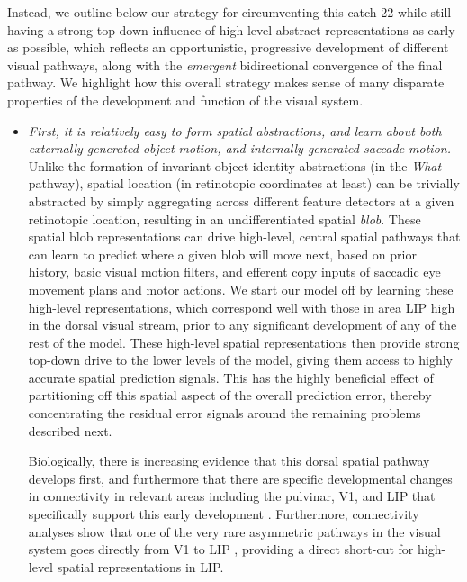 \documentclass[11pt,twoside]{article}
\newif\myifpdf
\begin{document}
Instead, we outline below our strategy for circumventing this catch-22 while still having a strong top-down influence of high-level abstract representations as early as possible, which reflects an opportunistic, progressive development of different visual pathways, along with the {\em emergent} bidirectional convergence of the final pathway.   We highlight how this overall strategy makes sense of many disparate properties of the development and function of the visual system.
\begin{itemize}
\item {\em First, it is relatively easy to form spatial abstractions, and learn about both externally-generated object motion, and internally-generated saccade motion.}  Unlike the formation of invariant object identity abstractions (in the {\em What} pathway), spatial location (in retinotopic coordinates at least) can be trivially abstracted by simply aggregating across different feature detectors at a given retinotopic location, resulting in an undifferentiated spatial {\em blob}.  These spatial blob representations can drive high-level, central spatial pathways that can learn to predict where a given blob will move next, based on prior history, basic visual motion filters, and efferent copy inputs of saccadic eye movement plans and motor actions.  We start our model off by learning these high-level representations, which correspond well with those in area LIP high in the dorsal visual stream, prior to any significant development of any of the rest of the model.  These high-level spatial representations then provide strong top-down drive to the lower levels of the model, giving them access to highly accurate spatial prediction signals.  This has the highly beneficial effect of partitioning off this spatial aspect of the overall prediction error, thereby concentrating the residual error signals around the remaining problems described next.

Biologically, there is increasing evidence that this dorsal spatial pathway develops first, and furthermore that there are specific developmental changes in connectivity in relevant areas including the pulvinar, V1, and LIP that specifically support this early development \cite{BridgeLeopoldBourne16}.  Furthermore, connectivity analyses show that one of the very rare asymmetric pathways in the visual system goes directly from V1 to LIP , providing a direct short-cut for high-level spatial representations in LIP.


\end{itemize}
\end{document}
